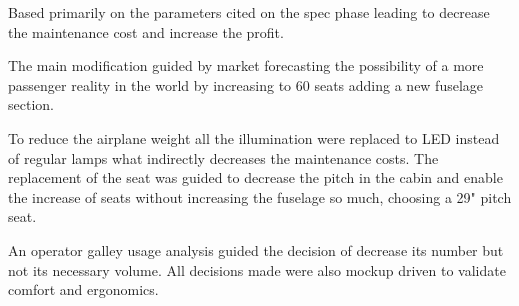 ﻿Based primarily on the parameters cited on the spec phase leading to decrease the maintenance cost and increase the profit.


The main modification guided by market forecasting the possibility of a more passenger reality in the world by increasing to 60 seats adding a new fuselage section.


To reduce the airplane weight all the illumination were replaced to LED instead of regular lamps what indirectly decreases the maintenance costs. The replacement of the seat was guided to decrease the pitch in the cabin and enable the increase of seats without increasing the fuselage so much, choosing a 29" pitch seat.


An operator galley usage analysis guided the decision of decrease its number but not its necessary volume.
All decisions made were also mockup driven to validate comfort and ergonomics.
